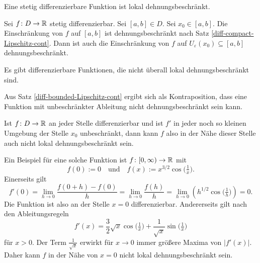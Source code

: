 \begin{Satz}
Eine stetig differenzierbare Funktion ist lokal dehnungsbeschränkt.
\end{Satz}
\begin{Beweis}
Sei $f\colon D\to\mathbb R$ stetig differenzierbar. Sei $[a,b]\in D$. Sei
$x_0\in [a,b]$. Die Einschränkung von $f$ auf $[a,b]$ ist
dehnungsbeschränkt nach Satz \ref{diff-compact-Lipschitz-cont}.
Dann ist auch die Einschränkung von $f$ auf
$U_\varepsilon(x_0)\subseteq [a,b]$ dehnungsbeschränkt.\;\qedsymbol
\end{Beweis}

\begin{Satz}
Es gibt differenzierbare Funktionen, die nicht überall lokal
dehnungsbeschränkt sind.
\end{Satz}
\begin{Beweis}
Aus Satz \ref{diff-bounded-Lipschitz-cont} ergibt sich als
Kontraposition, dass eine Funktion mit unbeschränkter Ableitung
nicht dehnungsbeschränkt sein kann.

Ist $f\colon D\to\mathbb R$ an jeder Stelle differenzierbar und ist $f'$
in jeder noch so kleinen Umgebung der Stelle $x_0$ unbeschränkt, dann
kann $f$ also in der Nähe dieser Stelle auch nicht lokal
dehnungsbeschränkt sein.

Ein Beispiel für eine solche Funktion ist
$f\colon{}[0,\infty)\to\mathbb R$ mit%
\[f(0):=0\quad \text{und}\quad f(x):=x^{3/2}\cos\Big(\tfrac{1}{x}\Big).\]
Einerseits gilt
\[f'(0) = \lim_{h\to 0}\frac{f(0+h)-f(0)}{h} = \lim_{h\to 0}\frac{f(h)}{h}
= \lim_{h\to 0} (h^{1/2}\cos\Big(\tfrac{1}{h}\Big)) = 0.\]
Die Funktion ist also an der Stelle $x=0$ differenzierbar.
Andererseits gilt nach den Ableitungsregeln%
\[f'(x) = \frac{3}{2}\sqrt{x}\cos\Big(\tfrac{1}{x}\Big)
+ \frac{1}{\sqrt{x}}\sin\Big(\tfrac{1}{x}\Big)\]
für $x>0$. Der Term $\tfrac{1}{\sqrt{x}}$ erwirkt für $x\to 0$ immer
größere Maxima von $|f'(x)|$. Daher kann $f$ in der Nähe von $x=0$ nicht
lokal dehnungsbeschränkt sein.\;\qedsymbol
\end{Beweis}

